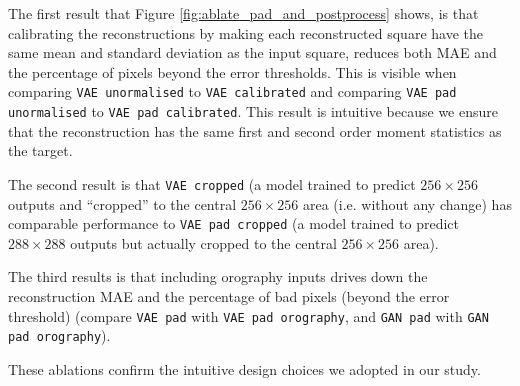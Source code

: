 \documentclass[11pt, a4paper, logo, copyright, numbering]{googledeepmind}
\begin{document}
The first result that Figure \ref{fig:ablate_pad_and_postprocess} shows, is that calibrating the reconstructions by making each reconstructed square have the same mean and standard deviation as the input square, reduces both MAE and the percentage of pixels beyond the error thresholds. This is visible when comparing {\tt VAE unormalised} to {\tt VAE calibrated} and comparing {\tt VAE pad unormalised} to {\tt VAE pad calibrated}. This result is intuitive because we ensure that the reconstruction has the same first and second order moment statistics as the target. 

The second result is that {\tt VAE cropped} (a model trained to predict $256 \times 256$ outputs and ``cropped'' to the central $256 \times 256$ area (i.e. without any change) has comparable performance to {\tt VAE pad cropped} (a model trained to predict $288 \times 288$ outputs but actually cropped to the central $256 \times 256$ area).

The third results is that including orography inputs drives down the reconstruction MAE and the percentage of bad pixels (beyond the error threshold) (compare {\tt VAE pad} with {\tt VAE pad orography}, and {\tt GAN pad} with {\tt GAN pad orography}).

These ablations confirm the intuitive design choices we adopted in our study.
\end{document}
